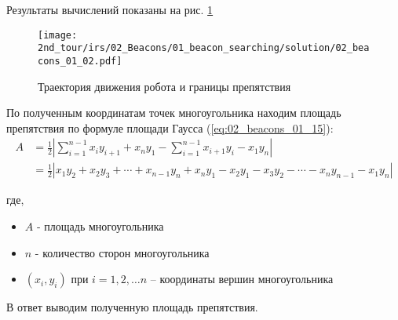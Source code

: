 Результаты вычислений показаны на рис. \ref{fig:02_beacons_01_02}

\begin{figure}[H]
	\centering
	\texttt{[image: 2nd\_tour/irs/02\_Beacons/01\_beacon\_searching/solution/02\_beacons\_01\_02.pdf]}
	\caption{Траектория движения робота и границы препятствия}
	\label{fig:02_beacons_01_02}
\end{figure}


По полученным координатам точек многоугольника находим площадь препятствия по формуле площади Гаусса (\ref{eq:02_beacons_01_15}):
\begin{equation}
	\begin{aligned}
		A & =\frac{1}{2} 
		\left|\sum_{i=1}^{n-1} x_i y_{i+1} + x_n y_1 - \sum_{i=1}^{n-1} x_{i+1} y_i -  x_1 y_n \right| \\ 
		& =
		\frac {1}{2} |x_1 y_2 + x_2 y_3 + \cdots + x_{n-1}y_n + x_n y_1 - x_2 y_1 - x_3 y_2- \cdots - x_n y_{n-1} - x_1 y_n |
	\end{aligned}
	\label{eq:02_beacons_01_15}
\end{equation}

где,
\begin{itemize}
	\item $A$ - площадь многоугольника
	\item $n$ - количество сторон многоугольника
	\item $(x_i, y_i)$ при $i = 1, 2, \dots n $ – координаты вершин многоугольника	
\end{itemize} 


В ответ выводим полученную площадь препятствия.


\codeExample

